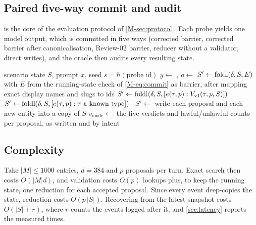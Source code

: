 \documentclass[letterpaper,journal,onecolumn]{IEEEtran}
\begin{document}
\subsection{Paired five-way commit and audit}\label{sec:alg-protocol}
 is the core of the evaluation protocol of \cref{M-sec:protocol}. Each probe yields one model output, which is committed in five ways (corrected barrier, corrected barrier after canonicalisation, Review-02 barrier, reducer without a validator, direct writes), and the oracle then audits every resulting state.

\begin{algorithm}[H]
\caption{Paired five-way commit and audit of one probe output}\label{alg:protocol}
\begin{algorithmic}[1]
\Require scenario state $S$, prompt $x$, seed $s=h(\text{probe id})$ 
\State $y\gets$ , \quad $o\gets$ 
   $S'\gets\operatorname{foldl}(\delta,S,E)$ with $E$ from the running-state check of \cref{M-eq:commit}
   as barrier, after mapping exact display names and slugs to ids 
   $S'\gets\operatorname{foldl}(\delta,S,[e(\tau,p):V_{\text{v1}}(\tau,p,S)])$ 
   $S'\gets\foldl(\delta,S,[e(\tau,p): \tau\ \text{a known type}])$ 
  \Else\ $S'\gets$ write each proposal and each new entity into a copy of $S$ 
  \EndIf
  \State $v_{\text{mode}}\gets$  
\EndFor
\State \Return the five verdicts and lawful/unlawful counts per proposal, as written and by intent
\end{algorithmic}
\end{algorithm}

\subsection{Complexity}
Take $|M|\le 1000$ entries, $d=384$ and $p$ proposals per turn. Exact search then costs $O(|M|d)$, and validation costs $O(p)$ lookups plus, to keep the running state, one reduction for each accepted proposal. Since every event deep-copies the state, reduction costs $O(p\,|S|)$. Recovering from the latest snapshot costs $O(|S|+r)$, where $r$ counts the events logged after it, and \cref{sec:latency} reports the measured times.
\end{document}
